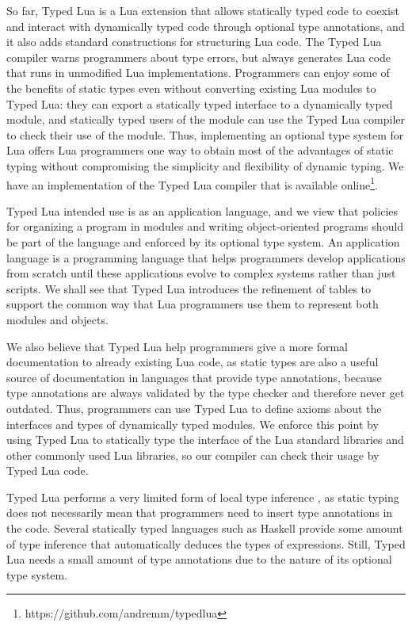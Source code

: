So far, Typed Lua is a Lua extension that allows statically typed
code to coexist and interact with dynamically typed code
through optional type annotations, and it also adds standard
constructions for structuring Lua code.
The Typed Lua compiler warns programmers about type errors,
but always generates Lua code that runs in unmodified Lua implementations.
Programmers can enjoy some of the benefits of static types
even without converting existing Lua modules to Typed Lua:
they can export a statically typed interface to a dynamically typed module,
and statically typed users of the module can use the Typed Lua compiler
to check their use of the module.
Thus, implementing an optional type system for Lua offers Lua
programmers one way to obtain most of the advantages of static typing
without compromising the simplicity and flexibility of dynamic typing.
We have an implementation of the Typed Lua compiler that is
available online\footnote{https://github.com/andremm/typedlua}.

Typed Lua intended use is as an application language, and we view
that policies for organizing a program in modules and writing
object-oriented programs should be part of the language and
enforced by its optional type system.
An application language is a programming language that helps
programmers develop applications from scratch until these
applications evolve to complex systems rather than just scripts.
We shall see that Typed Lua introduces the refinement of
tables to support the common way that Lua programmers use
them to represent both modules and objects.

We also believe that Typed Lua help programmers give a more
formal documentation to already existing Lua code, as static types
are also a useful source of documentation in languages that provide
type annotations, because type annotations are always validated by
the type checker and therefore never get outdated.
Thus, programmers can use Typed Lua to define axioms about the
interfaces and types of dynamically typed modules.
We enforce this point by using Typed Lua to statically type
the interface of the Lua standard libraries and other commonly used
Lua libraries, so our compiler can check their usage by Typed Lua
code.

Typed Lua performs a very limited form of local type inference
\citep{pierce2000lti}, as static typing does not necessarily mean
that programmers need to insert type annotations in the code.
Several statically typed languages such as Haskell provide some
amount of type inference that automatically deduces the types of
expressions.
Still, Typed Lua needs a small amount of type annotations due
to the nature of its optional type system.

